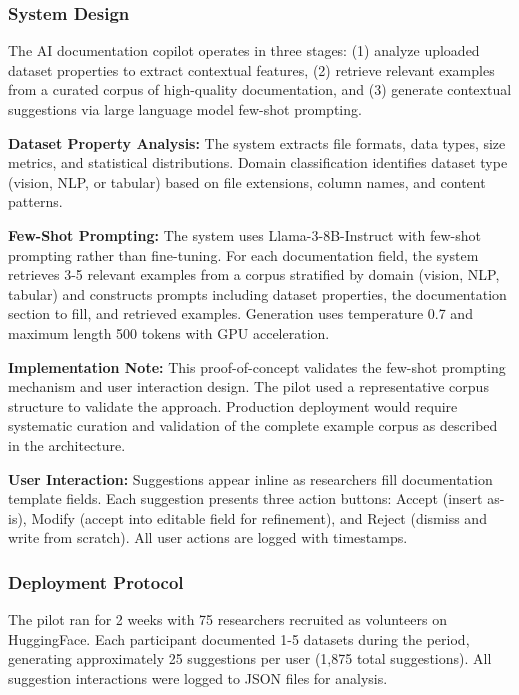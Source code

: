 
\subsubsection{System Design}

The AI documentation copilot operates in three stages: (1) analyze uploaded dataset properties to extract contextual features, (2) retrieve relevant examples from a curated corpus of high-quality documentation, and (3) generate contextual suggestions via large language model few-shot prompting.

\textbf{Dataset Property Analysis:} The system extracts file formats, data types, size metrics, and statistical distributions. Domain classification identifies dataset type (vision, NLP, or tabular) based on file extensions, column names, and content patterns.

\textbf{Few-Shot Prompting:} The system uses Llama-3-8B-Instruct with few-shot prompting rather than fine-tuning. For each documentation field, the system retrieves 3-5 relevant examples from a corpus stratified by domain (vision, NLP, tabular) and constructs prompts including dataset properties, the documentation section to fill, and retrieved examples. Generation uses temperature 0.7 and maximum length 500 tokens with GPU acceleration.

\textbf{Implementation Note:} This proof-of-concept validates the few-shot prompting mechanism and user interaction design. The pilot used a representative corpus structure to validate the approach. Production deployment would require systematic curation and validation of the complete example corpus as described in the architecture.

\textbf{User Interaction:} Suggestions appear inline as researchers fill documentation template fields. Each suggestion presents three action buttons: Accept (insert as-is), Modify (accept into editable field for refinement), and Reject (dismiss and write from scratch). All user actions are logged with timestamps.

\subsubsection{Deployment Protocol}

The pilot ran for 2 weeks with 75 researchers recruited as volunteers on HuggingFace. Each participant documented 1-5 datasets during the period, generating approximately 25 suggestions per user (1,875 total suggestions). All suggestion interactions were logged to JSON files for analysis.

